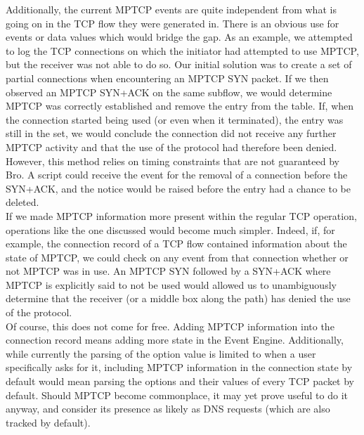 Additionally, the current MPTCP events are quite independent from what is going on in the TCP flow they were generated in. There is an obvious use for events or data values which would bridge the gap. As an example, we attempted to log the TCP connections on which the initiator had attempted to use MPTCP, but the receiver was not able to do so. Our initial solution was to create a set of partial connections when encountering an MPTCP SYN packet. If we then observed an MPTCP SYN+ACK on the same subflow, we would determine MPTCP was correctly established and remove the entry from the table. If, when the connection started being used (or even when it terminated), the entry was still in the set, we would conclude the connection did not receive any further MPTCP activity and that the use of the protocol had therefore been denied. However, this method relies on timing constraints that are not guaranteed by Bro. A script could receive the event for the removal of a connection before the SYN+ACK, and the notice would be raised before the entry had a chance to be deleted. \\

If we made MPTCP information more present within the regular TCP operation, operations like the one discussed would become much simpler. Indeed, if, for example, the connection record of a TCP flow contained information about the state of MPTCP, we could check on any event from that connection whether or not MPTCP was in use. An MPTCP SYN followed by a SYN+ACK where MPTCP is explicitly said to not be used would allowed us to unambiguously determine that the receiver (or a middle box along the path) has denied the use of the protocol. \\

Of course, this does not come for free. Adding MPTCP information into the connection record means adding more state in the Event Engine. Additionally, while currently the parsing of the option value is limited to when a user specifically asks for it, including MPTCP information in the connection state by default would mean parsing the options and their values of every TCP packet by default. Should MPTCP become commonplace, it may yet prove useful to do it anyway, and consider its presence as likely as DNS requests (which are also tracked by default).

